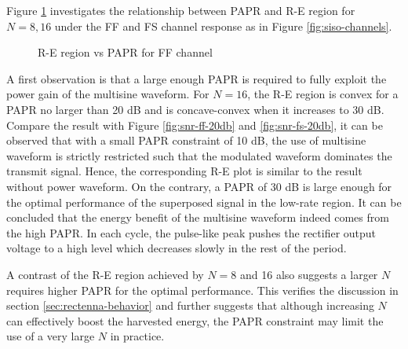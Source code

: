 Figure \ref{fig:re-papr} investigates the relationship between PAPR and R-E region for $N = 8, 16$ under the FF and FS channel response as in Figure \ref{fig:siso-channels}.

\begin{figure}[ht]
  \centering
  \quad
  \caption{R-E region vs PAPR for FF channel}
  \label{fig:re-papr}
\end{figure}

A first observation is that a large enough PAPR is required to fully exploit the power gain of the multisine waveform. For $N = 16$, the R-E region is convex for a PAPR no larger than 20 dB and is concave-convex when it increases to 30 dB. Compare the result with Figure \ref{fig:snr-ff-20db} and \ref{fig:snr-fs-20db}, it can be observed that with a small PAPR constraint of 10 dB, the use of multisine waveform is strictly restricted such that the modulated waveform dominates the transmit signal. Hence, the corresponding R-E plot is similar to the result without power waveform. On the contrary, a PAPR of 30 dB is large enough for the optimal performance of the superposed signal in the low-rate region. It can be concluded that the energy benefit of the multisine waveform indeed comes from the high PAPR. In each cycle, the pulse-like peak pushes the rectifier output voltage to a high level which decreases slowly in the rest of the period.

A contrast of the R-E region achieved by $N = 8$ and 16 also suggests a larger $N$ requires higher PAPR for the optimal performance. This verifies the discussion in section \ref{sec:rectenna-behavior} and further suggests that although increasing $N$ can effectively boost the harvested energy, the PAPR constraint may limit the use of a very large $N$ in practice. 